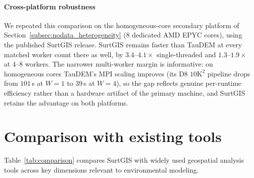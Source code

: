 \documentclass[preprint,review,12pt,authoryear]{elsarticle}
\newif\ifmarkedrev
\newcommand{\revtext}[1]{\ifmarkedrev\textcolor{blue}{#1}\else#1\fi}
\begin{document}
\paragraph{\revtext{Cross-platform robustness}} \revtext{We repeated this comparison on the homogeneous-core secondary platform of Section~\ref{subsec:nodata_heterogeneity} (8 dedicated AMD EPYC cores), using the published SurtGIS release. SurtGIS remains faster than TauDEM at every matched worker count there as well, by $3.4$--$4.1\times$ single-threaded and $1.3$--$1.9\times$ at 4--8 workers. The narrower multi-worker margin is informative: on homogeneous cores TauDEM's MPI scaling improves (its D8 $10\text{K}^2$ pipeline drops from $101$\,s at $W{=}1$ to $39$\,s at $W{=}4$), so the gap reflects genuine per-runtime efficiency rather than a hardware artifact of the primary machine, and SurtGIS retains the advantage on both platforms.}

\section{Comparison with existing tools}
\label{sec:comparison}

Table~\ref{tab:comparison} compares SurtGIS with widely used geospatial analysis tools across key dimensions relevant to environmental modeling.
\end{document}
